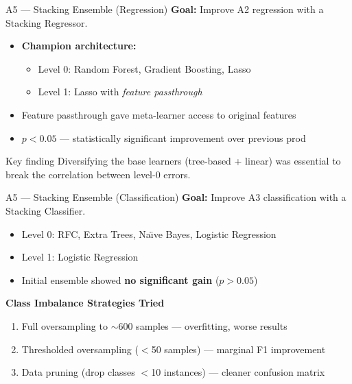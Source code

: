 \documentclass{beamer}
\begin{document}
\begin{frame}{A5 --- Stacking Ensemble (Regression)}
    \textbf{Goal:} Improve A2 regression with a Stacking Regressor.
    \vspace{0.5em}
    \begin{itemize}
        \item \textbf{Champion architecture:}
              \begin{itemize}
                  \item Level 0: Random Forest, Gradient Boosting, Lasso
                  \item Level 1: Lasso with \textit{feature passthrough}
              \end{itemize}
        \item Feature passthrough gave meta-learner access to original features
        \item $p < 0.05$ --- statistically significant improvement over previous prod
    \end{itemize}
    \vspace{0.5em}
    \begin{alertblock}{Key finding}
        Diversifying the base learners (tree-based + linear) was essential to
        break the correlation between level-0 errors.
    \end{alertblock}
\end{frame}

\begin{frame}{A5 --- Stacking Ensemble (Classification)}
    \textbf{Goal:} Improve A3 classification with a Stacking Classifier.
    \vspace{0.5em}
    \begin{itemize}
        \item Level 0: RFC, Extra Trees, Na\"{\i}ve Bayes, Logistic Regression
        \item Level 1: Logistic Regression
        \item Initial ensemble showed \textbf{no significant gain} ($p > 0.05$)
    \end{itemize}
    \vspace{0.5em}
    \textbf{Class Imbalance Strategies Tried}
    \begin{enumerate}
        \item Full oversampling to $\sim$600 samples --- overfitting, worse results
        \item Thresholded oversampling ($<$50 samples) --- marginal F1 improvement
        \item Data pruning (drop classes $<$10 instances) --- cleaner confusion matrix
    \end{enumerate}
\end{frame}
\end{document}
